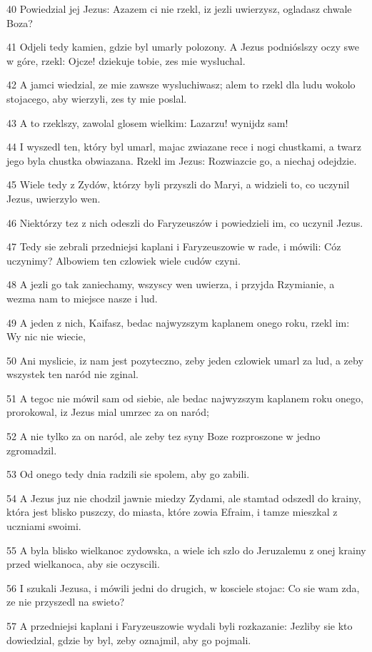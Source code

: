 \par 40 Powiedzial jej Jezus: Azazem ci nie rzekl, iz jezli uwierzysz, ogladasz chwale Boza?
\par 41 Odjeli tedy kamien, gdzie byl umarly polozony. A Jezus podnióslszy oczy swe w góre, rzekl: Ojcze! dziekuje tobie, zes mie wysluchal.
\par 42 A jamci wiedzial, ze mie zawsze wysluchiwasz; alem to rzekl dla ludu wokolo stojacego, aby wierzyli, zes ty mie poslal.
\par 43 A to rzeklszy, zawolal glosem wielkim: Lazarzu! wynijdz sam!
\par 44 I wyszedl ten, który byl umarl, majac zwiazane rece i nogi chustkami, a twarz jego byla chustka obwiazana. Rzekl im Jezus: Rozwiazcie go, a niechaj odejdzie.
\par 45 Wiele tedy z Zydów, którzy byli przyszli do Maryi, a widzieli to, co uczynil Jezus, uwierzylo wen.
\par 46 Niektórzy tez z nich odeszli do Faryzeuszów i powiedzieli im, co uczynil Jezus.
\par 47 Tedy sie zebrali przedniejsi kaplani i Faryzeuszowie w rade, i mówili: Cóz uczynimy? Albowiem ten czlowiek wiele cudów czyni.
\par 48 A jezli go tak zaniechamy, wszyscy wen uwierza, i przyjda Rzymianie, a wezma nam to miejsce nasze i lud.
\par 49 A jeden z nich, Kaifasz, bedac najwyzszym kaplanem onego roku, rzekl im: Wy nic nie wiecie,
\par 50 Ani myslicie, iz nam jest pozyteczno, zeby jeden czlowiek umarl za lud, a zeby wszystek ten naród nie zginal.
\par 51 A tegoc nie mówil sam od siebie, ale bedac najwyzszym kaplanem roku onego, prorokowal, iz Jezus mial umrzec za on naród;
\par 52 A nie tylko za on naród, ale zeby tez syny Boze rozproszone w jedno zgromadzil.
\par 53 Od onego tedy dnia radzili sie spolem, aby go zabili.
\par 54 A Jezus juz nie chodzil jawnie miedzy Zydami, ale stamtad odszedl do krainy, która jest blisko puszczy, do miasta, które zowia Efraim, i tamze mieszkal z uczniami swoimi.
\par 55 A byla blisko wielkanoc zydowska, a wiele ich szlo do Jeruzalemu z onej krainy przed wielkanoca, aby sie oczyscili.
\par 56 I szukali Jezusa, i mówili jedni do drugich, w kosciele stojac: Co sie wam zda, ze nie przyszedl na swieto?
\par 57 A przedniejsi kaplani i Faryzeuszowie wydali byli rozkazanie: Jezliby sie kto dowiedzial, gdzie by byl, zeby oznajmil, aby go pojmali.

